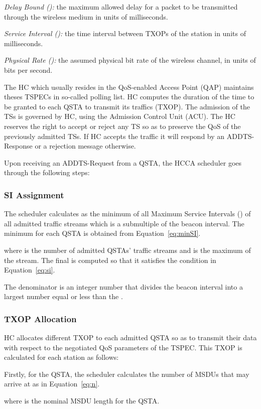 \documentclass[a4paper, conference]{IEEEtran}
\begin{document}
\textit{Delay Bound ():} the maximum allowed delay for a packet to be transmitted through the wireless medium in units of milliseconds.

\textit{Service Interval ():} the time interval between TXOPs of the station in units of milliseconds.

\textit{Physical Rate ():}  the assumed physical bit rate of the wireless channel, in units of bits per second.

The HC which usually resides in the QoS-enabled Access Point (QAP) maintains theses TSPECs in so-called polling list. HC computes the duration of the time to be granted to each QSTA to transmit its traffics (TXOP). The admission of the TSs is governed by HC, using the Admission Control Unit (ACU). The HC reserves the right to accept or reject any TS so as to preserve the QoS of the previously admitted TSs. If HC accepts the traffic it will respond by an ADDTS-Response or a rejection message otherwise.

Upon receiving an ADDTS-Request from a QSTA, the HCCA scheduler goes through the following steps:
\subsubsection{SI Assignment}
\label{eq:SIassign}
The scheduler calculates  as the minimum of all Maximum Service Intervals () of all admitted traffic streams which is a submultiple of the beacon interval. The minimum  for each QSTA is obtained from Equation~\eqref{eq:minSI}.

where  is the number of admitted QSTAs' traffic streams and  is the maximum  of the  stream.
The final  is computed so that it satisfies the condition in Equation~\eqref{eq:si}.

The denominator  is an integer number that divides the beacon interval into a largest number equal or less than the .

\subsubsection{TXOP Allocation}
HC allocates different TXOP to each admitted QSTA so as to transmit their data with respect to the negotiated QoS parameters of the TSPEC. This TXOP is calculated for each station as follows:

Firstly, for the  QSTA, the scheduler calculates the number of MSDUs that may arrive at  as in Equation~\eqref{eq:n}.

where  is the nominal MSDU length for the  QSTA.
\end{document}
